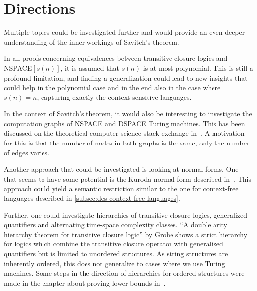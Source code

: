 \section{Directions}\label{sec:directions}
Multiple topics could be investigated further and would provide an even deeper understanding of the inner workings of Savitch's theorem.

In all proofs concerning equivalences between transitive closure logics and \acs{NSPACE}$[s(n)]$, it is assumed that $s(n)$ is at most polynomial.
This is still a profound limitation, and finding a generalization could lead to new insights that could help in the polynomial case and in the end also in the case where $s(n) = n$, capturing exactly the context-sensitive languages.

In the context of Savitch's theorem, it would also be interesting to investigate the computation graphs of \acs{NSPACE} and \acs{DSPACE} Turing machines.
This has been discussed on the theoretical computer science stack exchange in~\cite{Barak2010}.
A motivation for this is that the number of nodes in both graphs is the same, only the number of edges varies.

Another approach that could be investigated is looking at normal forms.
One that seems to have some potential is the Kuroda normal form described in~\cite{Kuroda1964}.
This approach could yield a semantic restriction similar to the one for context-free languages described in \cref{subsec:des-context-free-languages}.

Further, one could investigate hierarchies of transitive closure logics, generalized quantifiers and alternating time-space complexity classes.
``A double arity hierarchy theorem for transitive closure logic''\cite{Grohe1996} by Grohe shows a strict hierarchy for logics which combine the transitive closure operator with generalized quantifiers but is limited to unordered structures.
As string structures are inherently ordered, this does not generalize to cases where we use Turing machines.
Some steps in the direction of hierarchies for ordered structures were made in the chapter about proving lower bounds in~\cite{descriptive-complexity}.